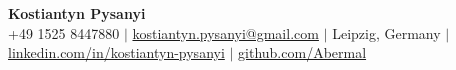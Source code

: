 \documentclass[letterpaper,10pt]{article}
\begin{document}
\begin{center}
  \textbf{\Huge Kostiantyn Pysanyi}\vspace{4pt} \\
  \small +49 1525 8447880 $|$ \href{mailto:kostiantyn.pysanyi@gmail.com}{kostiantyn.pysanyi@gmail.com} $|$ Leipzig, Germany $|$
  \href{https://www.linkedin.com/in/kostiantyn-pysanyi/}{linkedin.com/in/kostiantyn-pysanyi} $|$ \href{https://github.com/Abermal}{github.com/Abermal}
\end{center}
\addtolength{\topmargin}{-0.12in}
\enlargethispage{0.35in}
\vspace{-8pt}
\end{document}
